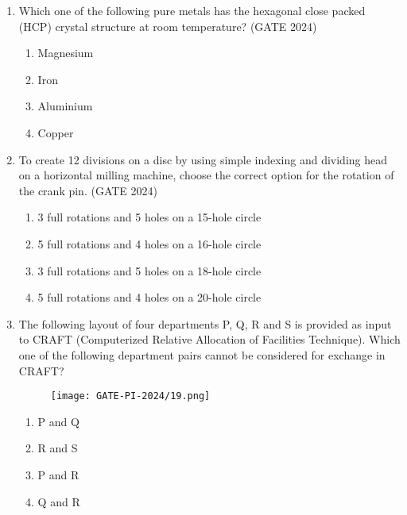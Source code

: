 \documentclass[journal,12pt,onecolumn]{IEEEtran}
\theoremstyle{remark}
\begin{document}
\begin{enumerate}
\item Which one of the following pure metals has the hexagonal close packed (HCP) crystal structure at room temperature?
\hfill{(GATE 2024)}
\begin{multicols}{4}
\begin{enumerate}
    \item Magnesium
    \item Iron
    \item Aluminium
    \item Copper
\end{enumerate}
\end{multicols}
\vspace{1cm}

\item To create 12 divisions on a disc by using simple indexing and dividing head on a horizontal milling machine, choose the correct option for the rotation of the crank pin.
\hfill{(GATE 2024)}
\begin{multicols}{4}
\begin{enumerate}
    \item 3 full rotations and 5 holes on a 15-hole circle
    \item 5 full rotations and 4 holes on a 16-hole circle
    \item 3 full rotations and 5 holes on a 18-hole circle
    \item 5 full rotations and 4 holes on a 20-hole circle
\end{enumerate}
\end{multicols}
\vspace{1cm}

\item The following layout of four departments P, Q, R and S is provided as input to CRAFT (Computerized Relative Allocation of Facilities Technique). Which one of the following department pairs cannot be considered for exchange in CRAFT?

\begin{figure}[H]
    \centering
    \texttt{[image: GATE-PI-2024/19.png]} 
    \caption{}
    \label{19}
\end{figure}
\begin{multicols}{4}
\begin{enumerate}
    \item P and Q
    \item R and S
    \item P and R
    \item Q and R
\end{enumerate}
\end{multicols}
\vspace{1cm}


\end{enumerate}
\end{document}
